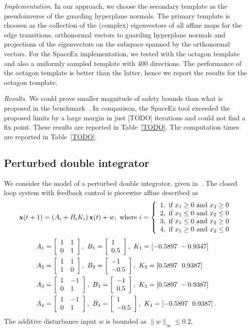 \emph{Implementation.}  In our approach, we choose the secondary
template as the pseudoinverse of the guarding hyperplane normals.  The
primary template is choosen as the collection of the (complex)
eigenvectors of all affine maps for the edge transitions, orthonormal
vectors to guarding hyperplane normals and projections of the
eigenvectors on the subspace spanned by the orthonormal vectors.  For
the SpaceEx implementation, we tested with the octagon template and
also a uniformly sampled template with 400 directions.  The
performance of the octagon template is better than the latter, hence
we report the results for the octagon template.

\emph{Results.}  We could prove smaller magnitude of safety bounds
than what is proposed in the benchmark~\cite{TODO}.  In comparison,
the SpaceEx tool exceeded the proposed limits by a large margin in just
[TODO] iterations and could not find a fix point.  These results are
reported in Table~\ref{TODO}.  The computation times are reported in
Table~\ref{TODO}.

\subsection{Perturbed double integrator}
We consider the model of a perturbed double integrator, given
in~\cite{TODO}.  The closed loop system with feedback control is piecewise affine described as
\[{\bf x}(t+1)=\left(A_i+B_iK_i\right){\bf x}(t)+w,~\text{where}~
i=\left\{\begin{array}{l}
1,~\text{if}~x_1\geq 0~\text{and}~x_2\geq 0\\
2,~\text{if}~x_1\leq 0~\text{and}~x_2\leq 0\\
3,~\text{if}~x_1\leq 0~\text{and}~x_2\geq 0\\
4,~\text{if}~x_1\geq 0~\text{and}~x_2\leq 0\\
\end{array} \right.\]
%
\begin{align*}
& A_1 =\left[\begin{array}{ll}
1 & 1\\
0 & 1
\end{array}\right],~B_1 = \left[\begin{array}{l}{1}\\{0.5} \end{array}\right],~K_1 = \left[-0.5897~
  -0.9347\right]\\
& A_2 = \left[\begin{array}{ll}
1 & 1\\
1 & 0
\end{array}
\right],~B_2 = \left[\begin{array}{l}{-1}\\{-0.5} \end{array}\right],~K_2 = \left[0.5897~~0.9387\right]\\
& A_3 = \left[\begin{array}{ll}
1 & -1\\
0 & 1
\end{array}
\right],~B_3 = \left[\begin{array}{l}{-1}\\{0.5} \end{array}\right],~K_3 = \left[0.5897~-0.9387\right]\\
& A_4 = \left[\begin{array}{ll}
1 & -1\\
0 & 1
\end{array}
\right],~B_4 = \left[\begin{array}{l}{1}\\{-0.5} \end{array}\right],~K_4 = \left[-0.5897~~0.9387\right].\\
\end{align*}
%  
The additive disturbance input $w$ is bounded as $\|w\|_{\infty}\leq
0.2$.  

